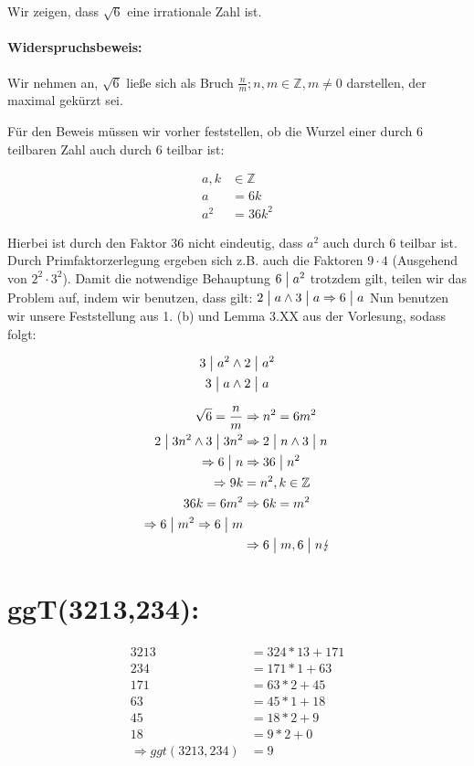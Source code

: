 \documentclass[11pt,a4paper]{article}
\begin{document}
\section{} %
Wir zeigen, dass $\sqrt{6}$ eine irrationale Zahl ist.

\paragraph{Widerspruchsbeweis:}
Wir nehmen an, $\sqrt{6}$ ließe sich als Bruch $\frac{n}{m}; n, m \in \mathbb{Z}, m \neq 0$ darstellen, der maximal gekürzt sei.

\noindent Für den Beweis müssen wir vorher feststellen, ob die Wurzel einer durch $6$ teilbaren Zahl auch durch $6$ teilbar ist:

\begin{align*}
a, k &\in \mathbb{Z}\\
a &= 6k\\
a^2 &= 36k^2
\end{align*}

Hierbei ist durch den Faktor $36$ nicht eindeutig, dass $a^2$ auch durch $6$ teilbar ist. Durch Primfaktorzerlegung ergeben sich z.B. auch die Faktoren $9 \cdot 4$ (Ausgehend von $2^2 \cdot 3^2$). Damit die notwendige Behauptung $6 \bigm| a^2$ trotzdem gilt, teilen wir das Problem auf, indem wir benutzen, dass gilt: $2 \bigm| a \wedge 3 \bigm| a \Rightarrow 6 \bigm| a$
Nun benutzen wir unsere Feststellung aus 1. (b) und Lemma 3.XX aus der Vorlesung, sodass folgt:

\begin{align*}
3 \bigm| a^2 &\wedge 2 \bigm| a^2\\
3 \bigm| a &\wedge 2 \bigm| a
\end{align*}

\begin{align*}
\sqrt{6} = \frac{n}{m} &\Rightarrow n^2 = 6m^2\\
2 \bigm| 3n^2 \wedge 3 \bigm| 3n^2 &\Rightarrow 2 \bigm| n \wedge 3 \bigm| n\\
\Rightarrow 6 \bigm| n &\Rightarrow 36 \bigm| n^2\\
\Rightarrow 9k &= n^2, k \in \mathbb{Z}\\
36k = 6m^2 &\Rightarrow 6k = m^2\\
\Rightarrow 6 \bigm| m^2 \Rightarrow 6 \bigm| m\\
&\Rightarrow 6 \bigm| m, 6 \bigm| n \lightning
\end{align*}


\section{ggT(3213,234):} %
\begin{align*}
3213 &= 324 * 13 + 171\\
234 &= 171 * 1 + 63\\
171 &= 63 * 2 + 45\\
63 &= 45 * 1 + 18\\
45 &= 18 * 2 + 9\\
18 &= 9 * 2 + 0\\
\Rightarrow ggt(3213,234) &= 9
\end{align*}
\end{document}
